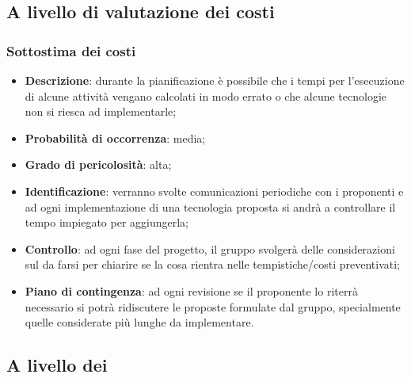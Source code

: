 \subsection{A livello di valutazione dei costi}
		
\subsubsection{Sottostima dei costi}
\begin{itemize}
			\item \textbf{Descrizione}: durante la pianificazione è possibile che i tempi per l'esecuzione di alcune attività vengano calcolati in modo errato o che alcune tecnologie non si riesca ad implementarle;
			\item \textbf{Probabilità di occorrenza}: media;
			\item \textbf{Grado di pericolosità}: alta;
			\item \textbf{Identificazione}: verranno svolte comunicazioni periodiche con i proponenti e ad ogni implementazione di una tecnologia proposta si andrà a controllare il tempo impiegato per aggiungerla;
			\item \textbf{Controllo}: ad ogni fase del progetto, il gruppo svolgerà delle considerazioni sul da farsi per chiarire se la cosa rientra nelle tempistiche/costi preventivati;
			\item \textbf{Piano di contingenza}: ad ogni revisione se il proponente lo riterrà necessario si potrà ridiscutere le proposte formulate dal gruppo, specialmente quelle considerate più lunghe da implementare.
\end{itemize}

\subsection{A livello dei }
	
